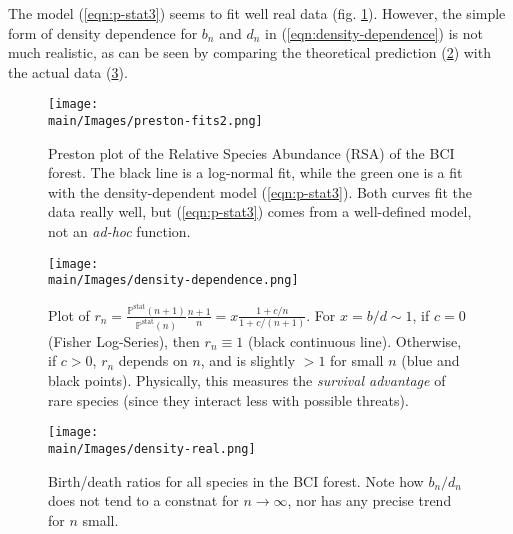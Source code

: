 \documentclass[../../main.tex]{subfiles}
\begin{document}
The model (\ref{eqn:p-stat3}) seems to fit well real data (fig. \ref{fig:preston-fits2}). However, the simple form of density dependence for $b_n$ and $d_n$ in (\ref{eqn:density-dependence}) is not much realistic, as can be seen by comparing the theoretical prediction (\ref{fig:density-dependence}) with the actual data (\ref{fig:density-real}).


\begin{figure}[H]
    \centering
    \texttt{[image: \\main/Images/preston-fits2.png]}
    \caption{Preston plot of the Relative Species Abundance (RSA) of the BCI forest. The black line is a log-normal fit, while the green one is a fit with the density-dependent model (\ref{eqn:p-stat3}). Both curves fit the data really well, but (\ref{eqn:p-stat3}) comes from a well-defined model, not an \textit{ad-hoc} function.}
    \label{fig:preston-fits2}
\end{figure}



\begin{figure}[H]
    \centering
    \texttt{[image: \\main/Images/density-dependence.png]}
    \caption{Plot of $r_n = \frac{\mathbb{P}^{\mathrm{stat}}(n+1)}{\mathbb{P}^{\mathrm{stat}}(n)} \frac{n+1}{n} = x \frac{1+c/n}{1 + c/(n+1)}$. For $x = b/d \sim 1$, if $c = 0$ (Fisher Log-Series), then $r_n \equiv 1$ (black continuous line). Otherwise, if $c > 0$, $r_n$ depends on $n$, and is slightly $>1$ for small $n$ (blue and black points). Physically, this measures the \textit{survival advantage} of rare species (since they interact less with possible threats).}
    \label{fig:density-dependence}
\end{figure}

\begin{figure}[H]
    \centering
    \texttt{[image: \\main/Images/density-real.png]}
    \caption{Birth/death ratios for all species in the BCI forest. Note how $b_n/d_n$ does not tend to a constnat for $n \to \infty$, nor has any precise trend for $n$ small.}
    \label{fig:density-real}
\end{figure}


\end{document}
